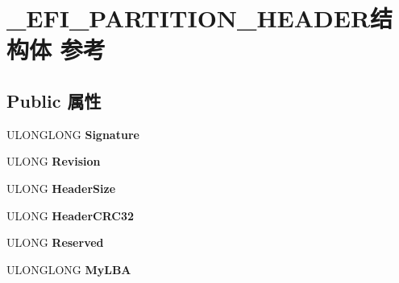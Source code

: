 \hypertarget{struct___e_f_i___p_a_r_t_i_t_i_o_n___h_e_a_d_e_r}{}\section{\+\_\+\+E\+F\+I\+\_\+\+P\+A\+R\+T\+I\+T\+I\+O\+N\+\_\+\+H\+E\+A\+D\+E\+R结构体 参考}
\label{struct___e_f_i___p_a_r_t_i_t_i_o_n___h_e_a_d_e_r}
\subsection*{Public 属性}
\begin{DoxyCompactItemize}
\item 
\mbox{\label{struct___e_f_i___p_a_r_t_i_t_i_o_n___h_e_a_d_e_r_aaa4b8f0dd9c11a49b12d7e20a327a462}} 
U\+L\+O\+N\+G\+L\+O\+NG {\bfseries Signature}
\item 
\mbox{\label{struct___e_f_i___p_a_r_t_i_t_i_o_n___h_e_a_d_e_r_ade363ca9bbff2dc609d7d61ef5eecc9b}} 
U\+L\+O\+NG {\bfseries Revision}
\item 
\mbox{\label{struct___e_f_i___p_a_r_t_i_t_i_o_n___h_e_a_d_e_r_aaec54530ce0b41ae8fef1d18f27ea8d0}} 
U\+L\+O\+NG {\bfseries Header\+Size}
\item 
\mbox{\label{struct___e_f_i___p_a_r_t_i_t_i_o_n___h_e_a_d_e_r_a5f68c3315f25ac2296347aa880228afd}} 
U\+L\+O\+NG {\bfseries Header\+C\+R\+C32}
\item 
\mbox{\label{struct___e_f_i___p_a_r_t_i_t_i_o_n___h_e_a_d_e_r_a85c856a8c53626a845dacc186478198b}} 
U\+L\+O\+NG {\bfseries Reserved}
\item 
\mbox{\label{struct___e_f_i___p_a_r_t_i_t_i_o_n___h_e_a_d_e_r_acd861b1b6692a367a71e63f696ed8f16}} 
U\+L\+O\+N\+G\+L\+O\+NG {\bfseries My\+L\+BA}
\item 
\mbox{\label{struct___e_f_i___p_a_r_t_i_t_i_o_n___h_e_a_d_e_r_a9dee55b232d0f7ae7c80d57e1fb0b2d4}} 

\end{DoxyCompactItemize}
